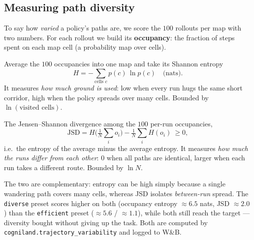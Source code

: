 \documentclass[11pt]{article}
\begin{document}
\subsection{Measuring path diversity}

To say how \emph{varied} a policy's paths are, we score the $100$ rollouts per
map with two numbers. For each rollout we build its \textbf{occupancy}: the
fraction of steps spent on each map cell (a probability map over cells).

\begin{description}[leftmargin=1.4em, itemsep=3pt]
\item[Occupancy entropy (nats).] Average the $100$ occupancies into one map and
  take its Shannon entropy
  \[
    H = -\sum_{\text{cells } c} p(c)\,\ln p(c)\quad\text{(nats)} .
  \]
  It measures \emph{how much ground is used}: low when every run hugs the same
  short corridor, high when the policy spreads over many cells. Bounded by
  $\ln(\text{visited cells})$.
\item[Across-trajectory JSD (nats).] The Jensen--Shannon divergence among the
  $100$ per-run occupancies,
  \[
    \mathrm{JSD} = H\!\Big(\tfrac{1}{N}\textstyle\sum_i o_i\Big)
                 - \tfrac{1}{N}\textstyle\sum_i H(o_i)\ \ge 0 ,
  \]
  i.e.\ the entropy of the average minus the average entropy. It measures
  \emph{how much the runs differ from each other}: $0$ when all paths are
  identical, larger when each run takes a different route. Bounded by $\ln N$.
\end{description}

The two are complementary: entropy can be high simply because a single wandering
path covers many cells, whereas JSD isolates \emph{between-run} spread. The
\texttt{diverse} preset scores higher on both (occupancy entropy ${\approx}6.5$
nats, JSD ${\approx}2.0$) than the \texttt{efficient} preset (${\approx}5.6$ /
${\approx}1.1$), while both still reach the target --- diversity bought without
giving up the task. Both are computed by
\texttt{cogniland.trajectory\_variability} and logged to W\&B.
\end{document}

